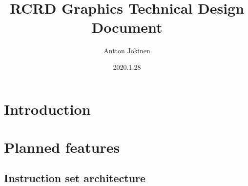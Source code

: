 \documentclass[titlepage]{article}
\title{RCRD Graphics Technical Design Document}
\date{2020.1.28}
\author{Antton Jokinen}
\begin{document}
\maketitle
\newpage
\tableofcontents
\newpage
{}


\section{Introduction}


\section{Planned features}
\subsection{Instruction set architecture}
\end{document}
